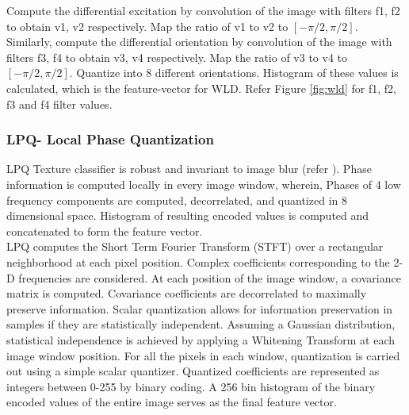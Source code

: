 \documentclass[english, 12pt]{article}
\begin{document}
\tab Compute the differential excitation by convolution of the image with filters f1, f2 to obtain v1, v2 respectively. Map the ratio of v1 to v2 to $[-\pi/2,\pi/2]$. Similarly, compute the differential orientation by convolution of the image with filters f3, f4 to obtain v3, v4 respectively. Map the ratio of v3 to v4 to $[-\pi/2,\pi/2]$. Quantize into 8 different orientations. Histogram of these values is calculated, which is the feature-vector for WLD. Refer Figure \ref{fig:wld} for f1, f2, f3 and f4 filter values.


\subsubsection{LPQ- Local Phase Quantization}
\tab LPQ Texture classifier is robust and invariant to image blur (refer \cite{Rahtu:2012:LPQ:2364628.2364653}). Phase information is computed locally in every image window, wherein, Phases of 4 low frequency components are computed, decorrelated, and quantized in 8 dimensional space. Histogram of resulting encoded values is computed and concatenated to form the feature vector.
\\
\tab LPQ computes the Short Term Fourier Transform (STFT) over a rectangular neighborhood at each pixel position. Complex coefficients corresponding to the 2-D frequencies are considered. At each position of the image window, a covariance matrix is computed. Covariance coefficients are decorrelated to maximally preserve information. Scalar quantization allows for information preservation in samples if they are statistically independent. Assuming a Gaussian distribution, statistical independence is achieved by applying a Whitening 	Transform at each image window position. For all the pixels in each window, quantization is carried out using a simple scalar quantizer. Quantized coefficients are represented as integers between 0-255 by binary coding. A 256 bin histogram of the binary encoded values of the entire image serves as the final feature vector.
\end{document}
